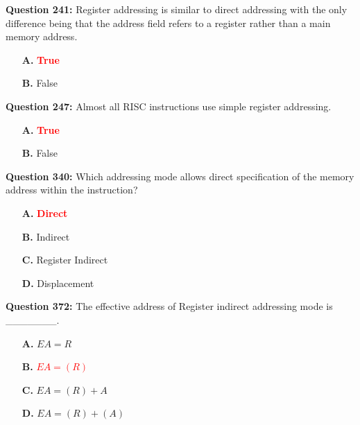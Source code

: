 \documentclass[12pt,a4paper]{article}
\begin{document}
\textbf{Question 241:} Register addressing is similar to direct addressing with the only difference being that the address field refers to a register rather than a main memory address.

\begin{itemize}
    \item[\textbf{A.}] \textcolor{red}{\textbf{True}}
    \item[\textbf{B.}] False
\end{itemize}

\vspace{0.5cm}

\textbf{Question 247:} Almost all RISC instructions use simple register addressing.

\begin{itemize}
    \item[\textbf{A.}] \textcolor{red}{\textbf{True}}
    \item[\textbf{B.}] False
\end{itemize}

\vspace{0.5cm}

\textbf{Question 340:} Which addressing mode allows direct specification of the memory address within the instruction?

\begin{itemize}
    \item[\textbf{A.}] \textcolor{red}{\textbf{Direct}}
    \item[\textbf{B.}] Indirect
    \item[\textbf{C.}] Register Indirect
    \item[\textbf{D.}] Displacement
\end{itemize}

\vspace{0.5cm}

\textbf{Question 372:} The effective address of Register indirect addressing mode is _______.

\begin{itemize}
    \item[\textbf{A.}] $EA = R$
    \item[\textbf{B.}] \textcolor{red}{\textbf{$EA = (R)$}}
    \item[\textbf{C.}] $EA = (R) + A$
    \item[\textbf{D.}] $EA = (R) + (A)$
\end{itemize}

\vspace{0.5cm}
\end{document}
